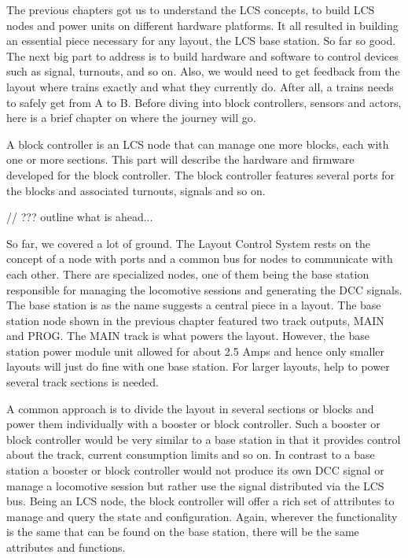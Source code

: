 
The previous chapters got us to understand the LCS concepts, to build LCS nodes and power units on different hardware platforms. It all resulted in building an essential piece necessary for any layout, the LCS base station. So far so good. The next big part to address is to build hardware and software to control devices such as signal, turnouts, and so on. Also, we would need to get feedback from the layout where trains exactly and what they currently do. After all, a trains needs to safely get from A to B. Before diving into block controllers, sensors and actors, here is a brief chapter on where the journey will go.

A block controller is an LCS node that can manage one more blocks, each with one or more sections. This part will describe the hardware and firmware developed for the block controller. The block controller features several ports for the blocks and associated turnouts, signals and so on.

// ??? outline what is ahead...


So far, we covered a lot of ground. The Layout Control System rests on the concept of a node with ports and a common bus for nodes to communicate with each other. There are specialized nodes, one of them being the base station responsible for managing the locomotive sessions and generating the DCC signals. The base station is as the name suggests a central piece in a layout. The base station node shown in the previous chapter featured two track outputs, MAIN and PROG. The MAIN track is what powers the layout. However, the base station power module unit allowed for about 2.5 Amps and hence only smaller layouts will just do fine with one base station. For larger layouts, help to power several track sections is needed.

A common approach is to divide the layout in several sections or blocks and power them individually with a booster or block controller. Such a booster or block controller would be very similar to a base station in that it provides control about the track, current consumption limits and so on. In contrast to a base station a booster or block controller would not produce its own DCC signal or manage a locomotive session but rather use the signal distributed via the LCS bus. Being an LCS node, the block controller will offer a rich set of attributes to manage and query the state and configuration. Again, wherever the functionality is the same that can be found on the base station, there will be the same attributes and functions.

